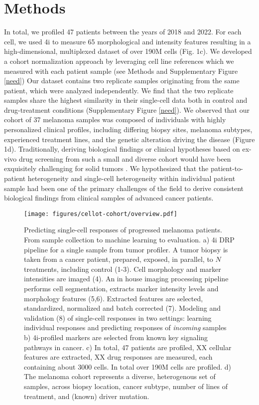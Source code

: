 \section{Methods}

In total, we profiled 47 patients between the years of 2018 and 2022.
For each cell, we used 4i to measure 65 morphological and intensity features resulting in a high-dimensional, multiplexed dataset of over 190M cells (Fig. 1c).
We developed a cohort normalization approach by leveraging cell line references which we measured with each patient sample (see Methods and Supplementary Figure \ref{need})
Our dataset contains two replicate samples originating from the same patient, which were analyzed independently.
We find that the two replicate samples share the highest similarity in their single-cell data both in control and drug-treatment conditions (Supplementary Figure \ref{need}).
We observed that our cohort of 37 melanoma samples was composed of individuals with highly personalized clinical profiles, including differing biopsy sites, melanoma subtypes, experienced treatment lines, and the genetic alteration driving the disease (Figure 1d). 
Traditionally, deriving biological findings or clinical hypotheses based on ex-vivo drug screening from such a small and diverse cohort would have been exquisitely challenging for solid tumors \cite{need}.
We hypothesized that the patient-to-patient heterogeneity and single-cell heterogeneity within individual patient sample had been one of the primary challenges of the field to derive consistent biological findings from clinical samples of advanced cancer patients.

\begin{figure}[h!]
  \label{cellot-cohort-overview}
  \centering
  \texttt{[image: figures/cellot-cohort/overview.pdf]}
  \caption{
    Predicting single-cell responses of progressed melanoma patients.
    From sample collection to machine learning to evaluation.
    a) 4i DRP pipeline for a single sample from tumor profiler.
    A tumor biopsy is taken from a cancer patient, prepared,
    exposed, in parallel, to $N$ treatments, including control (1-3).
    Cell morphology and marker intensities are imaged (4).
    An in house imaging processing pipeline performs cell segmentation,
    extracts marker intensity levels and morphology features (5,6).
    Extracted features are selected, standardized, normalized and batch corrected (7).
    Modeling and validation (8) of single-cell responses in two settings: learning individual responses and predicting responses of \emph{incoming} samples
    b) 4i-profiled markers are selected from known key signaling pathways in cancer.
    c) In total, 47 patients are profiled, XX cellular features are extracted, XX drug responses are measured, each containing about 3000 cells. In total over 190M cells are profiled.
    d) The melanoma cohort represents a diverse, heterogenous set of samples,
    across biopsy location, cancer subtype, number of lines of treatment, and (known) driver mutation.
  }
\end{figure}

